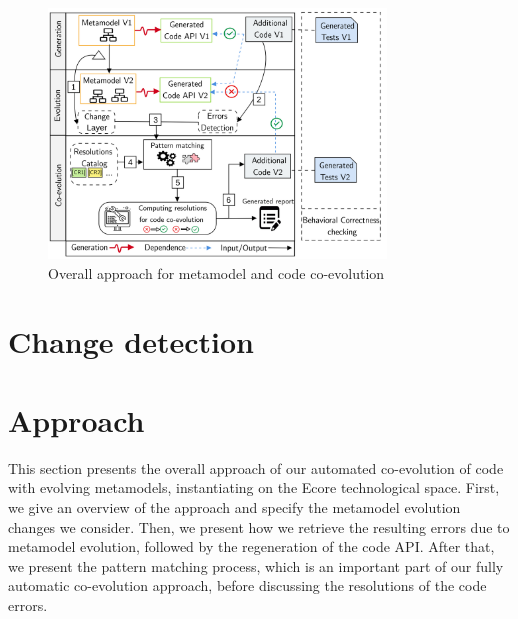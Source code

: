 

\begin{figure}[t]\centering%
	\centering
	\includegraphics[width=0.8\textwidth]{./pics/chapter1pics/ApproachV5.png}
	\caption{Overall approach for metamodel and code co-evolution}
	\label{fig:overallapproach}
	\vspace{-1em}
\end{figure}
\section{Change detection}
\label{sec: ap1_changedetection}

\section{Approach}\label{approach}

This section presents the overall approach of our automated co-evolution of code with evolving metamodels,  instantiating on the Ecore technological space. First, we give an overview of the approach and specify the metamodel evolution changes we consider. 
%
Then, we present how we retrieve the resulting errors due to metamodel evolution, followed by the regeneration of the code API. 
After that, we present the pattern matching process, which is an important part of our fully automatic co-evolution approach, before discussing the resolutions of the code errors. 

